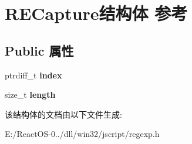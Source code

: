 \hypertarget{struct_r_e_capture}{}\section{R\+E\+Capture结构体 参考}
\label{struct_r_e_capture}
\subsection*{Public 属性}
\begin{DoxyCompactItemize}
\item 
\mbox{\label{struct_r_e_capture_a1ad9a846b65de60119133da0c6c993fe}} 
ptrdiff\+\_\+t {\bfseries index}
\item 
\mbox{\label{struct_r_e_capture_a7285e23dbfb42bec28ac85ee4b092099}} 
size\+\_\+t {\bfseries length}
\end{DoxyCompactItemize}


该结构体的文档由以下文件生成\+:\begin{DoxyCompactItemize}
\item 
E\+:/\+React\+O\+S-\/0../dll/win32/jscript/regexp.\+h\end{DoxyCompactItemize}
